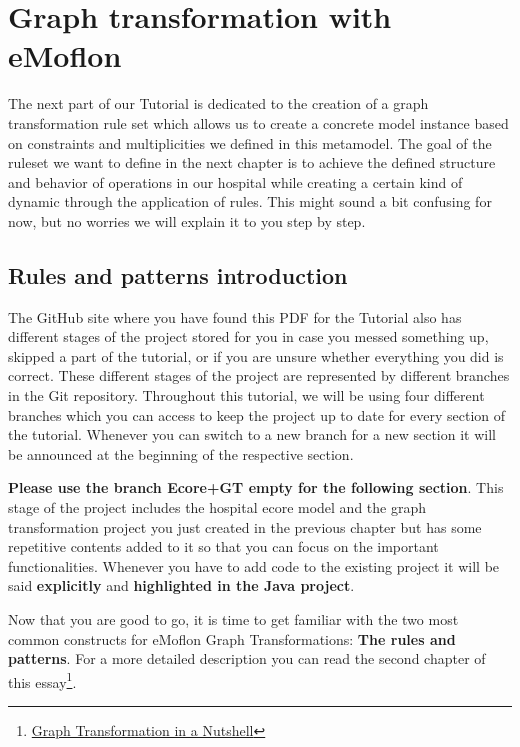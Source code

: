 \section{Graph transformation with eMoflon}

The next part of our Tutorial is dedicated to the creation of a graph transformation rule set which allows us to create a concrete model instance based on constraints and multiplicities we defined in this metamodel. The goal of the ruleset we want to define in the next chapter is to achieve the defined structure and behavior of operations in our hospital while creating a certain kind of dynamic through the application of rules. This might sound a bit confusing for now, but no worries we will explain it to you step by step.

\subsection{Rules and patterns introduction}

The GitHub site where you have found this PDF for the Tutorial also has different stages of the project stored for you in case you messed something up, skipped a part of the tutorial, or if you are unsure whether everything you did is correct.
These different stages of the project are represented by different branches in the Git repository. Throughout this tutorial, we will be using four different branches which you can access to keep the project up to date for every section of the tutorial. Whenever you can switch to a new branch for a new section it will be announced at the beginning of the respective section.\newline

\textbf{Please use the branch \textsf{Ecore+GT empty} for the following section}.
This stage of the project includes the hospital ecore model and the graph transformation project you just created in the previous chapter but has some repetitive contents added to it so that you can focus on the important functionalities.\newline
Whenever you have to add code to the existing project it will be said \textbf{explicitly} and \textbf{highlighted in the Java project}.\newline

Now that you are good to go, it is time to get familiar with the two most common constructs for eMoflon Graph Transformations: \textbf{The rules and patterns}. For a more detailed description you can read the second chapter of this essay\footnote{\href{https://www.cs.le.ac.uk/people/rh122/papers/2006/Hec06Nutshell.pdf}{Graph Transformation in a Nutshell}}.\newline

